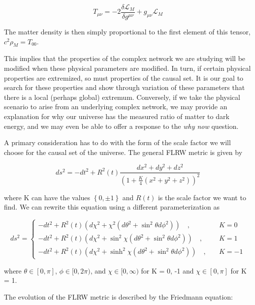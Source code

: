 \documentclass[preprint,notitlepage,amsmath,amssymb,floatfix]{revtex4-1}
\begin{document}
\begin{equation}
\label{eq:EL_stress_energy}
T_{\mu\nu} = -2\frac{\delta\mathcal{L}_M}{\delta g^{\mu\nu}} + g_{\mu\nu}\mathcal{L}_M
\end{equation}

\noindent The matter density is then simply proportional to the first element of this tensor, $c^2\rho_M = T_{00}$. \par
This implies that the properties of the complex network we are studying will be modified when these physical parameters are modified.
In turn, if certain physical properties are extremized, so must properties of the causal set.
It is our goal to search for these properties and show through variation of these parameters that there is a local (perhaps global) extremum.
Conversely, if we take the physical scenario to arise from an underlying complex network, we may provide an explanation for why our universe has the measured ratio of matter to dark energy, and we may even be able to offer a response to the \textit{why now} question. \par
A primary consideration has to do with the form of the scale factor we will choose for the causal set of the universe.  The general FLRW metric is given by

\begin{equation}
ds^2 = -dt^2 + R^2\left(t\right)\frac{dx^2 + dy^2 + dz^2}{\left(1 + \frac{K}{4}\left(x^2+y^2+z^2\right)\right)^2}
\end{equation}

\noindent where K can have the values $\left\{0, \pm 1\right\}$ and $R\left(t\right)$ is the scale factor we want to find.  We can rewrite this equation using a different parameterization as

\begin{equation}\label{ds^2}
ds^2 = 
\begin{cases}
-dt^2 + R^2\left(t\right)\left(d\chi^2 + \chi^2\left(d\theta^2+\sin^2\theta d\phi^2\right)\right)\quad, & \quad K = 0 \\
-dt^2 + R^2\left(t\right)\left(d\chi^2 + \sin^2\chi\left(d\theta^2 + \sin^2\theta d\phi^2\right)\right)\quad, & \quad K = 1 \\
-dt^2 + R^2\left(t\right)\left(d\chi^2 + \sinh^2\chi\left(d\theta^2 + \sin^2\theta d\phi^2\right)\right)\quad, & \quad K = -1
\end{cases}
\end{equation}

\noindent where $\theta\in[0,\pi]$, $\phi\in[0,2\pi)$, and $\chi\in[0,\infty)$ for K = 0, -1 and $\chi\in[0,\pi]$ for K = 1. \par
The evolution of the FLRW metric is described by the Friedmann equation:
\end{document}
